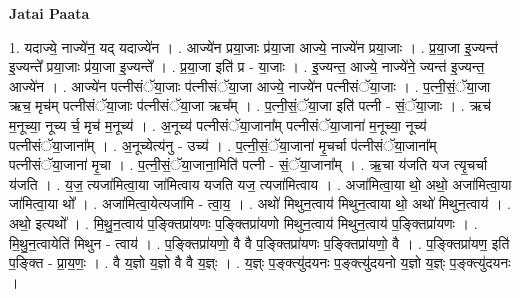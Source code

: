 \documentclass[17pt]{extarticle}
\begin{document}
\textbf{Jatai Paata} \newline

1. यदाज्ये॒ नाज्ये॑न॒ यद् यदाज्ये॑न । . आज्ये॑न प्रया॒जाः प्र॑या॒जा आज्ये॒ नाज्ये॑न प्रया॒जाः । . प्र॒या॒जा इ॒ज्यन्त॑ इ॒ज्यन्ते᳚ प्रया॒जाः प्र॑या॒जा इ॒ज्यन्ते᳚ । . प्र॒या॒जा इति॑ प्र - या॒जाः । . इ॒ज्यन्त॒ आज्ये॒ नाज्ये॑ने॒ ज्यन्त॑ इ॒ज्यन्त॒ आज्ये॑न । . आज्ये॑न पत्नीसंॅया॒जाः प॑त्नीसंॅया॒जा आज्ये॒ नाज्ये॑न पत्नीसंॅया॒जाः । . प॒त्नी॒सं॒ॅया॒जा ऋच॒ मृच॑म् पत्नीसंॅया॒जाः प॑त्नीसंॅया॒जा ऋच᳚म् । . प॒त्नी॒सं॒ॅया॒जा इति॑ पत्नी - सं॒ॅया॒जाः । . ऋच॑ म॒नूच्या॒ नूच्य र्च॒ मृच॑ म॒नूच्य॑ । . अ॒नूच्य॑ पत्नीसंॅया॒जाना᳚म् पत्नीसंॅया॒जाना॑ म॒नूच्या॒ नूच्य॑ पत्नीसंॅया॒जाना᳚म् । . अ॒नूच्येत्य॑नु - उच्य॑ । . प॒त्नी॒सं॒ॅया॒जाना॑ मृ॒चर्चा प॑त्नीसंॅया॒जाना᳚म् पत्नीसंॅया॒जाना॑ मृ॒चा । . प॒त्नी॒सं॒ॅया॒जाना॒मिति॑ पत्नी - सं॒ॅया॒जाना᳚म् । . ऋ॒चा य॑जति यज त्यृ॒चर्चा य॑जति । . य॒ज॒ त्यजा॑मित्वा॒या जा॑मित्वाय यजति यज॒ त्यजा॑मित्वाय । . अजा॑मित्वा॒या थो॒ अथो॒ अजा॑मित्वा॒या जा॑मित्वा॒या थो᳚ । . अजा॑मित्वा॒येत्यजा॑मि - त्वा॒य॒ । . अथो॑ मिथुन॒त्वाय॑ मिथुन॒त्वाया थो॒ अथो॑ मिथुन॒त्वाय॑ । . अथो॒ इत्यथो᳚ । . मि॒थु॒न॒त्वाय॑ प॒ङ्क्तिप्रा॑यणः प॒ङ्क्तिप्रा॑यणो मिथुन॒त्वाय॑ मिथुन॒त्वाय॑ प॒ङ्क्तिप्रा॑यणः । . मि॒थु॒न॒त्वायेति॑ मिथुन - त्वाय॑ । . प॒ङ्क्तिप्रा॑यणो॒ वै वै प॒ङ्क्तिप्रा॑यणः प॒ङ्क्तिप्रा॑यणो॒ वै । . प॒ङ्क्तिप्रा॑यण॒ इति॑ प॒ङ्क्ति - प्रा॒य॒णः॒ । . वै य॒ज्ञो य॒ज्ञो वै वै य॒ज्ञ्ः । . य॒ज्ञ्ः प॒ङ्क्त्यु॑दयनः प॒ङ्क्त्यु॑दयनो य॒ज्ञो य॒ज्ञ्ः प॒ङ्क्त्यु॑दयनः । \newline
\end{document}
